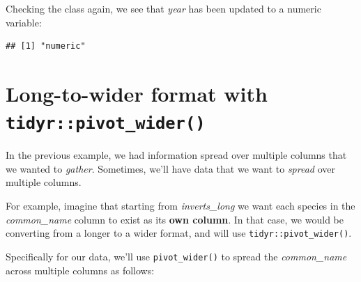 \documentclass[]{book}
\newenvironment{Shaded}{\begin{snugshade}}{\end{snugshade}}
\newcommand{\CommentTok}[1]{\textcolor[rgb]{0.56,0.35,0.01}{\textit{#1}}}
\newcommand{\DataTypeTok}[1]{\textcolor[rgb]{0.13,0.29,0.53}{#1}}
\newcommand{\KeywordTok}[1]{\textcolor[rgb]{0.13,0.29,0.53}{\textbf{#1}}}
\newcommand{\NormalTok}[1]{#1}
\newcommand{\OperatorTok}[1]{\textcolor[rgb]{0.81,0.36,0.00}{\textbf{#1}}}
\newcommand{\StringTok}[1]{\textcolor[rgb]{0.31,0.60,0.02}{#1}}
\begin{document}
\begin{Shaded}
\end{Shaded}

Checking the class again, we see that \emph{year} has been updated to a numeric variable:

\begin{Shaded}
\end{Shaded}

\begin{verbatim}
## [1] "numeric"
\end{verbatim}

\hypertarget{long-to-wider-format-with-tidyrpivot_wider}{%
\section{\texorpdfstring{Long-to-wider format with \texttt{tidyr::pivot\_wider()}}{Long-to-wider format with tidyr::pivot\_wider()}}\label{long-to-wider-format-with-tidyrpivot_wider}}

In the previous example, we had information spread over multiple columns that we wanted to \emph{gather}. Sometimes, we'll have data that we want to \emph{spread} over multiple columns.

For example, imagine that starting from \emph{inverts\_long} we want each species in the \emph{common\_name} column to exist as its \textbf{own column}. In that case, we would be converting from a longer to a wider format, and will use \texttt{tidyr::pivot\_wider()}.

Specifically for our data, we'll use \texttt{pivot\_wider()} to spread the \emph{common\_name} across multiple columns as follows:

\begin{Shaded}
\end{Shaded}
\end{document}
